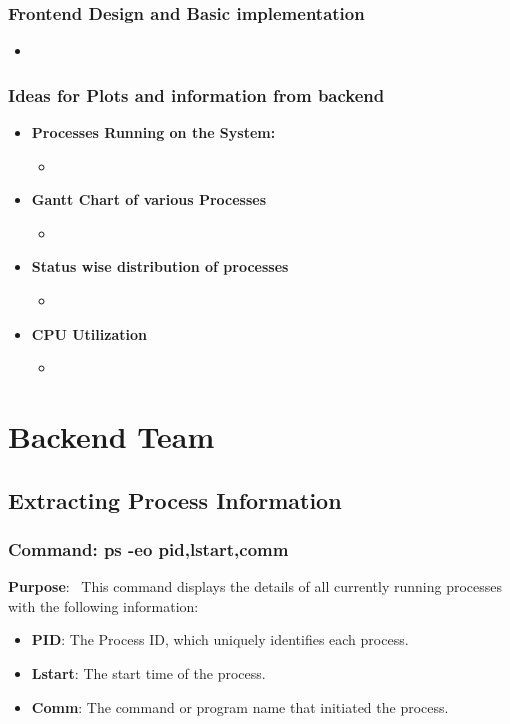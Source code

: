 \documentclass[12pt]{article}
\begin{document}
\subsubsection{Frontend Design and Basic implementation}
\begin{itemize}
    \item
\end{itemize}
\subsubsection{Ideas for Plots and information from backend}
\begin{itemize}
    \item {\bf Processes Running on the System:}
    \begin{itemize}
        \item
    \end{itemize}
    \item {\bf Gantt Chart of various Processes}
    \begin{itemize}
        \item
    \end{itemize}
    \item {\bf Status wise distribution of processes}
    \begin{itemize}
        \item
    \end{itemize}
    \item {\bf CPU Utilization}
    \begin{itemize}
        \item
    \end{itemize}
\end{itemize}

\section{Backend Team}
\subsection{Extracting Process Information}
\subsubsection{Command: ps -eo pid,lstart,comm}

\textbf{Purpose}: \
This command displays the details of all currently running processes with the following information:

\begin{itemize}
    \item \textbf{PID}: The Process ID, which uniquely identifies each process.
    \item \textbf{Lstart}: The start time of the process.
    \item \textbf{Comm}: The command or program name that initiated the process.
\end{itemize}
\end{document}
